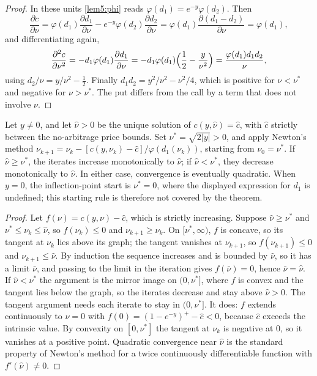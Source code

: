 \begin{chapterrefs}
\begin{proof}
In these units \cref{lem5:phi} reads $\varphi(d_1)=e^{-y}\varphi(d_2)$. Then
\begin{equation*}
  \frac{\partial c}{\partial \nu}=\varphi(d_1)\frac{\partial d_1}{\partial \nu}-e^{-y}\varphi(d_2)\frac{\partial d_2}{\partial \nu}
  =\varphi(d_1)\frac{\partial(d_1-d_2)}{\partial \nu}=\varphi(d_1),
\end{equation*}
and differentiating again,
\begin{equation*}
  \frac{\partial^2c}{\partial \nu^2}=-d_1\varphi(d_1)\frac{\partial d_1}{\partial \nu}=-d_1\varphi(d_1)\Bigl(\frac12-\frac{y}{\nu^2}\Bigr)
  =\frac{\varphi(d_1)d_1d_2}{\nu},
\end{equation*}
using $d_2/\nu=y/\nu^2-\tfrac12$. Finally
$d_1d_2=y^2/\nu^2-\nu^2/4$, which is positive for $\nu<\nu^*$ and negative for $\nu>\nu^*$. The put differs from
the call by a term that does not involve $\nu$.
\end{proof}

\begin{theorem}\label{thm5:newton}
Let $y\ne0$, and let $\hat\nu>0$ be the unique solution of $c(y,\hat\nu)=\hat c$, with $\hat c$ strictly between
the no-arbitrage price bounds. Set $\nu^*=\sqrt{2|y|}>0$, and apply Newton's method
$\nu_{k+1}=\nu_k-[c(y,\nu_k)-\hat c]/\varphi(d_1(\nu_k))$, starting from $\nu_0=\nu^*$. If $\hat\nu\ge\nu^*$, the
iterates increase monotonically to $\hat\nu$; if $\hat\nu<\nu^*$, they decrease monotonically to $\hat\nu$. In
either case, convergence is eventually quadratic. When $y=0$, the inflection-point start is $\nu^*=0$, where
the displayed expression for $d_1$ is undefined; this starting rule is therefore not covered by the
theorem.
\end{theorem}

\begin{proof}
Let $f(\nu)=c(y,\nu)-\hat c$, which is strictly increasing. Suppose $\hat\nu\ge \nu^*$ and $\nu^*\le \nu_k\le\hat\nu$,
so $f(\nu_k)\le0$ and $\nu_{k+1}\ge \nu_k$. On $[\nu^*,\infty)$, $f$ is concave, so its tangent at $\nu_k$ lies
above its graph; the tangent vanishes at $\nu_{k+1}$, so $f(\nu_{k+1})\le0$ and $\nu_{k+1}\le\hat\nu$. By
induction the sequence increases and is bounded by $\hat\nu$, so it has a limit $\bar\nu$, and passing to
the limit in the iteration gives $f(\bar\nu)=0$, hence $\bar\nu=\hat\nu$. If $\hat\nu<\nu^*$ the argument is the
mirror image on $(0,\nu^*]$, where $f$ is convex and the tangent lies below the graph, so the iterates
decrease and stay above $\hat\nu>0$. The tangent argument needs each iterate to stay in $(0,\nu^*]$. It
does: $f$ extends continuously to $\nu=0$ with $f(0)=(1-e^{-y})^+-\hat c<0$, because $\hat c$ exceeds the
intrinsic value. By convexity on $[0,\nu^*]$ the tangent at $\nu_k$ is negative at $0$, so it vanishes at
a positive point. Quadratic convergence near $\hat\nu$ is the standard property of Newton's method for a
twice continuously differentiable function with $f'(\hat\nu)\ne0$.
\end{proof}


\end{chapterrefs}
